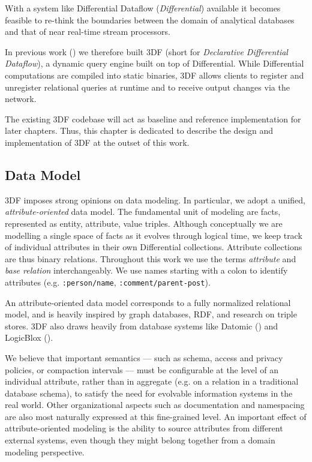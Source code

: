 \documentclass[../index.tex]{subfiles}
\begin{document}
With a system like Differential Dataflow (\emph{Differential})
available it becomes feasible to re-think the boundaries between the
domain of analytical databases and that of near real-time stream
processors.

In previous work (\cite{declarative}) we therefore built 3DF (short
for \emph{Declarative Differential Dataflow}), a dynamic query engine
built on top of Differential. While Differential computations are
compiled into static binaries, 3DF allows clients to register and
unregister relational queries at runtime and to receive output changes
via the network.

The existing 3DF codebase will act as baseline and reference
implementation for later chapters. Thus, this chapter is dedicated to
describe the design and implementation of 3DF at the outset of this
work.

\subsection{Data Model} \label{3df-data-model}

3DF imposes strong opinions on data modeling. In particular, we adopt
a unified, \emph{attribute-oriented} data model. The fundamental unit
of modeling are facts, represented as entity, attribute, value
triples. Although conceptually we are modelling a single space of
facts as it evolves through logical time, we keep track of individual
attributes in their own Differential collections. Attribute
collections are thus binary relations. Throughout this work we use the
terms \emph{attribute} and \emph{base relation} interchangeably. We
use names starting with a colon to identify attributes
(e.g. \texttt{:person/name}, \texttt{:comment/parent-post}).

An attribute-oriented data model corresponds to a fully normalized
relational model, and is heavily inspired by graph databases, RDF, and
research on triple stores. 3DF also draws heavily from database
systems like Datomic (\cite{datomic}) and LogicBlox
(\cite{aref2015design}).

We believe that important semantics — such as schema, access and
privacy policies, or compaction intervals — must be configurable at
the level of an individual attribute, rather than in aggregate
(e.g. on a relation in a traditional database schema), to satisfy the
need for evolvable information systems in the real world. Other
organizational aspects such as documentation and namespacing are also
most naturally expressed at this fine-grained level. An important
effect of attribute-oriented modeling is the ability to source
attributes from different external systems, even though they might
belong together from a domain modeling perspective.
\end{document}
